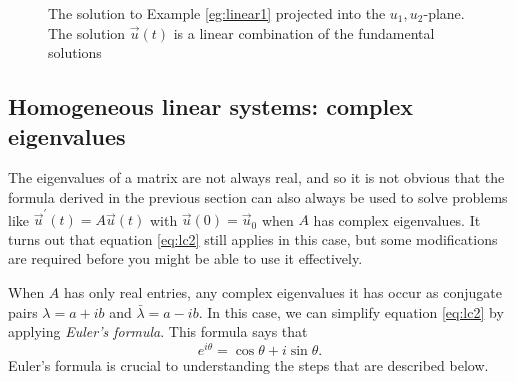 \documentclass[../book.tex]{subfiles}
\begin{document}
\begin{figure}
\begin{center}
    \parbox{3.75in}{
      \caption{The solution to Example \ref{eg:linear1} projected into the \(u_1,u_2\)-plane. The solution \(\vec{u}(t)\) is a linear combination of the fundamental solutions\label{fig:eg_illustrate} }
    }
  \end{center}
\end{figure}

\subsection{Homogeneous linear systems: complex eigenvalues}

The eigenvalues of a matrix are not always real, and so it is not obvious that the formula derived in the previous section can also always be used to solve problems like \(\vec{u}^{ \prime}(t) = A \vec{u}(t)\) with \(\vec{u}(0) = \vec{u}_0\) when \(A\) has complex eigenvalues. It turns out that equation \eqref{eq:lc2} still applies in this case, but some modifications are required before you might be able to use it effectively.

When \(A\) has only real entries, any complex eigenvalues it has occur as conjugate pairs \(\lambda = a+i b\) and \(\bar \lambda = a-i b\). In this case, we can simplify equation \eqref{eq:lc2}  by applying \emph{Euler's formula}. This formula says that
\begin{equation}\label{eq:sys-20}
e^{i \theta} = \cos \theta + i  \sin \theta.
\end{equation}
Euler's formula is crucial to understanding the steps that are described below.
\end{document}

